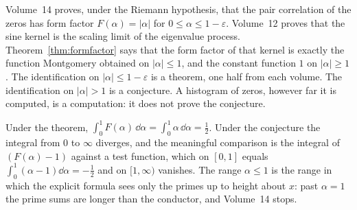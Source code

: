 Volume~14 proves, under the Riemann hypothesis, that the pair correlation of the zeros has form factor $F(\alpha)=|\alpha|$ for $0\le\alpha\le1-\varepsilon$. Volume~12 proves that the sine kernel is the scaling limit of the eigenvalue process. Theorem~\ref{thm:formfactor} says that the form factor of that kernel is exactly the function Montgomery obtained on $|\alpha|\le1$, and the constant function $1$ on $|\alpha|\ge1$. The identification on $|\alpha|\le1-\varepsilon$ is a theorem, one half from each volume. The identification on $|\alpha|>1$ is a conjecture. A histogram of zeros, however far it is computed, is a computation: it does not prove the conjecture.

\begin{examplex}
Under the theorem, $\int_0^1 F(\alpha)\,\dd\alpha=\int_0^1\alpha\,\dd\alpha=\tfrac12$. Under the conjecture the integral from $0$ to $\infty$ diverges, and the meaningful comparison is the integral of $(F(\alpha)-1)$ against a test function, which on $[0,1]$ equals $\int_0^1(\alpha-1)\dd\alpha=-\tfrac12$ and on $[1,\infty)$ vanishes. The range $\alpha\le1$ is the range in which the explicit formula sees only the primes up to height about $x$: past $\alpha=1$ the prime sums are longer than the conductor, and Volume~14 stops.
\end{examplex}


